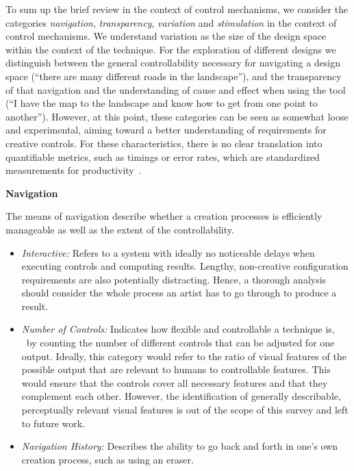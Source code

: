 To sum up the brief review in the context of control mechanisms, we consider the categories \textit{navigation}, \textit{transparency}, \textit{variation} and \textit{stimulation} in the context of control mechanisms. We understand variation as the size of the design space within the context of the technique. For the exploration of different designs we distinguish between the general controllability necessary for navigating a design space (``there are many different roads in the landscape''), and the transparency of that navigation and the understanding of cause and effect when using the tool (``I have the map to the landscape and know how to get from one point to another'').  However, at this point, these categories can be seen as somewhat loose and experimental, aiming toward a better understanding of requirements for creative controls. For these characteristics, there is no clear translation into quantifiable metrics, such as timings or error rates, which are standardized measurements for productivity~\cite{cherry_2014_qcs,shneiderman_2007_cst}.

\noindent\textbf{Navigation}

The means of navigation describe whether a creation processes is efficiently manageable as well as the extent of the controllability.

\begin{itemize}
    \item \textit{Interactive:} Refers to a system with ideally no noticeable delays when executing controls and computing results. Lengthy, non-creative configuration requirements are also potentially distracting. Hence, a thorough analysis should consider the whole process an artist has to go through to produce a result.
    \item \textit{Number of Controls:} Indicates how flexible and controllable a technique is, \eg~by counting the number of different controls that can be adjusted for one output. 
    Ideally, this category would refer to the ratio of visual features of the possible output that are relevant to humans to controllable features. This would ensure that the controls cover all necessary features and that they complement each other. However, the identification of generally describable, perceptually relevant visual features is out of the scope of this survey and left to future work.

    \item \textit{Navigation History:} Describes the ability to go back and forth in one's own creation process, such as using an eraser.
\end{itemize}



